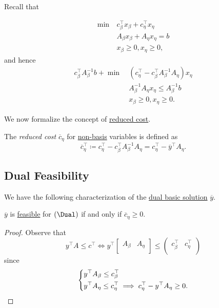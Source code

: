 Recall that
\begin{prev}
	\[
		\begin{aligned}
			\min~ & c^{\top}_{\beta}x_{\beta} + c^{\top}_{\eta}x_{\eta} \\
			      & A_{\beta}x_{\beta} + A_{\eta}x_{\eta} = b           \\
			      & x_{\beta}\geq 0, x_{\eta}\geq 0,
		\end{aligned}
	\]
	and hence
	\[
		\begin{aligned}
			c^{\top}_{\beta}A^{-1}_{\beta}b + \min~ & (c_{\eta}^{\top} - c_{\beta}^{\top}A^{-1}_{\beta}A_{\eta})x_{\eta} \\
			                                        & A^{-1}_{\beta}A_{\eta}x_{\eta} \leq A^{-1}_{\beta}b                \\
			                                        & x_{\beta}\geq 0, x_{\eta}\geq 0.
		\end{aligned}
	\]
\end{prev}

We now formalize the concept of \hyperref[note:reduced-cost]{reduced cost}.

\begin{definition}\label{def:reduced-cost}
	The \emph{reduced cost} \(\overline{c}_{\eta}\) for \hyperref[def:non-basis]{non-basis} variables is defined as
	\[
		\overline{c}_{\eta}^{\top} \coloneqq c_{\eta}^{\top} - c_{\beta}^{\top} A^{-1}_{\beta}A_{\eta} = c_{\eta}^{\top} - \overline{y}^{\top}A_{\eta}.
	\]
\end{definition}

\subsection{Dual Feasibility}
We have the following characterization of the \hyperref[def:dual-basic-solution]{dual basic solution} \(\overline{y} \).

\begin{lemma}\label{lma:lec7-2}
	\(\overline{y}\) is \hyperref[def:feasible-solution]{feasible} for \((\Dual)\) if and only if \(\overline{c}_{\eta}\geq 0\).
\end{lemma}
\begin{proof}
	Observe that
	\[
		y^{\top}A\leq c^{\top} \iff y^{\top}\begin{bmatrix}
			A_{\beta} & A_{\eta} \\
		\end{bmatrix}\leq \begin{pmatrix}
			c_{\beta}^{\top} & c_{\eta}^{\top} \\
		\end{pmatrix}
	\]
	since
	\[
		\begin{dcases}
			y^{\top} A_{\beta} \leq c_{\beta}^{\top} \\
			y^{\top} A_{\eta}  \leq c_{\eta}^{\top} \implies c_{\eta}^{\top} - y^{\top}A_{\eta}\geq 0.
		\end{dcases}
	\]
\end{proof}

